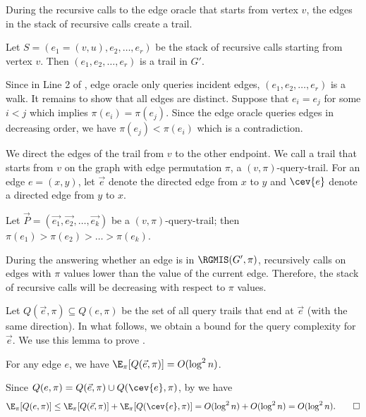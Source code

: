 During the recursive calls to the edge oracle that starts from vertex $v$, the edges in the stack of recursive calls create a trail. 

\begin{observation}
Let $S = (e_1 = (v, u), e_2, \ldots, e_r)$ be the stack of recursive calls starting from vertex $v$. Then $(e_1, e_2, \ldots, e_r)$ is a trail in $G'$.
\end{observation}
\begin{myproof}
Since in Line 2 of , edge oracle only queries incident edges, $(e_1, e_2, \ldots, e_r)$ is a walk. It remains to show that all edges are distinct. Suppose that $e_i = e_j$ for some $i < j$ which implies $\pi(e_i) = \pi(e_j)$. Since the edge oracle queries edges in decreasing order, we have $\pi(e_j) < \pi(e_i)$ which is a contradiction. 
\end{myproof}


We direct the edges of the trail from $v$ to the other endpoint. We call a trail that starts from $v$ on the graph with edge permutation $\pi$, a $(v,\pi)$-query-trail. For an edge $e = (x,y)$, let $\vec{e}$ denote the directed edge from $x$ to $y$ and $\cev{e}$ denote a directed edge from $y$ to $x$. 

\begin{observation}\label{obs:increasing_trail}
Let $\vec{P} = (\vec{e_1}, \vec{e_2}, \ldots, \vec{e_k})$ be a $(v, \pi)$-query-trail; then $\pi(e_1) > \pi(e_2) > \ldots > \pi(e_k)$.
\end{observation}
\begin{myproof}
During the answering whether an edge is in $\RGMIS(G',\pi)$,  recursively calls on edges with 
$\pi$ values lower than the value of the current edge. Therefore, the stack of recursive calls will be decreasing with respect to $\pi$ values.
\end{myproof}

Let $Q(\vec{e}, \pi) \subseteq Q(e, \pi)$ be the set of all query trails that end at $\vec{e}$ (with the same direction). In what follows, we obtain a bound for the query complexity for $\vec{e}$. We use this lemma to prove .


\begin{lemma}\label{lem: query-complexity-directed}
For any edge $e$, we have $\E_\pi[Q(\vec{e}, \pi)] = O(\log^2 n)$.
\end{lemma}

\begin{myproof}
Since $Q(e, \pi) = Q(\vec{e}, \pi) \cup Q(\cev{e}, \pi)$, by  we have 
\begin{align*}
\E_\pi[Q(e, \pi)] \leq \E_\pi[Q(\vec{e}, \pi)] + \E_\pi[Q(\cev{e}, \pi)] = O(\log^2 n) + O(\log^2 n) = O(\log^2 n). \qedhere
\end{align*}
\end{myproof}



